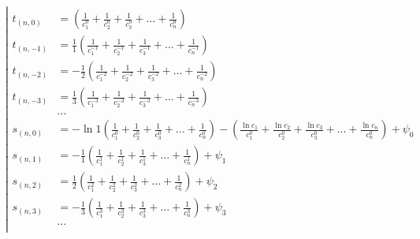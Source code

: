 \begin{equation*} \left| \begin{aligned}
t_{(n,0)} &=
  \left(
  \frac{1}{c_1^0}
+ \frac{1}{c_2^0}
+ \frac{1}{c_3^0}
+ \ldots
+ \frac{1}{c_n^0} \right) \\
%
t_{(n,-1)} &=
  \frac{1}{1} \left(
  \frac{1}{c_1^{-1}}
+ \frac{1}{c_2^{-1}}
+ \frac{1}{c_3^{-1}}
+ \ldots
+ \frac{1}{c_n^{-1}} \right) \\
%
t_{(n,-2)} &=
- \frac{1}{2} \left(
  \frac{1}{c_1^{-2}}
+ \frac{1}{c_2^{-2}}
+ \frac{1}{c_3^{-2}}
+ \ldots
+ \frac{1}{c_n^{-2}} \right) \\
%
t_{(n,-3)} &=
  \frac{1}{3} \left(
  \frac{1}{c_1^{-3}}
+ \frac{1}{c_2^{-3}}
+ \frac{1}{c_3^{-3}}
+ \ldots
+ \frac{1}{c_n^{-3}} \right) \\
%
&\ldots \\
%
s_{(n,0)} &=
- \ln{1} \left(
  \frac{1}{c_1^0}
+ \frac{1}{c_2^0}
+ \frac{1}{c_3^0}
+ \ldots
+ \frac{1}{c_n^0} \right)
- \left(
  \frac{\ln{c_1}}{c_1^0}
+ \frac{\ln{c_2}}{c_2^0}
+ \frac{\ln{c_3}}{c_3^0}
+ \ldots
+ \frac{\ln{c_n}}{c_n^0} \right)
+ \psi_0 \\
%
s_{(n,1)} &=
- \frac{1}{1} \left(
  \frac{1}{c_1^1}
+ \frac{1}{c_2^1}
+ \frac{1}{c_3^1}
+ \ldots
+ \frac{1}{c_n^1} \right)
+ \psi_1 \\
%
s_{(n,2)} &=
  \frac{1}{2} \left(
  \frac{1}{c_1^2}
+ \frac{1}{c_2^2}
+ \frac{1}{c_3^2}
+ \ldots
+ \frac{1}{c_n^2} \right)
+ \psi_2 \\
%
s_{(n,3)} &=
- \frac{1}{3} \left(
  \frac{1}{c_1^3}
+ \frac{1}{c_2^3}
+ \frac{1}{c_3^3}
+ \ldots
+ \frac{1}{c_n^3} \right)
+ \psi_3 \\
%
&\ldots \\
\end{aligned} \right. \end{equation*}
